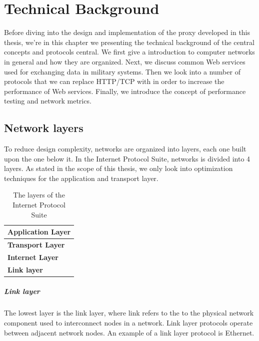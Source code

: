 \chapter{Technical Background}

Before diving into the design and implementation of the proxy developed in this
thesis, we're in this chapter we presenting the technical background of the
central concepts and protocols central. We first give a introduction to computer
networks in general and how they are organized. Next, we discuss common Web
services used for exchanging data in military systems. Then we look into a
number of protocols that we can replace HTTP/TCP with in order to increase the
performance of Web services. Finally, we introduce the concept of performance
testing and network metrics.

\section{Network layers}

To reduce design complexity, networks are organized into layers, each one built
upon the one below it. In the Internet Protocol Suite\cite{rfc-1122}, networks
is divided into 4 layers. As stated in the scope of this thesis, we only look
into optimization techniques for the application and transport layer.

\begin{table}[h]
\begin{tabularx}{\textwidth}{| X |}
\hline
  \textbf{Application Layer} \\ \hline
  \textbf{Transport Layer} \\ \hline
  \textbf{Internet Layer} \\ \hline
  \textbf{Link layer} \\ \hline
\end{tabularx}
\caption{The layers of the Internet Protocol Suite}
\label{figure-network-layers}
\end{table}

\paragraph{Link layer}

The lowest layer is the link layer, where link refers to the to the physical
network component used to interconnect nodes in a network. Link layer protocols
operate between adjacent network nodes. An example of a link layer protocol is
Ethernet.

